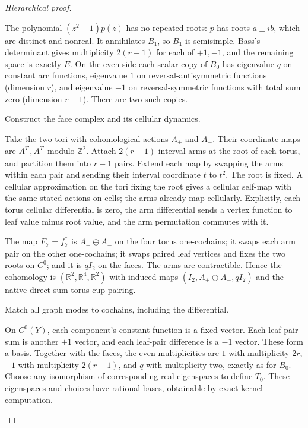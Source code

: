 \documentclass[11pt,a4paper]{article}
\theoremstyle{remark}\newtheorem{remark}[definition]{Remark}
\newcommand{\R}{\mathbb R}\newcommand{\C}{\mathbb C}\newcommand{\Z}{\mathbb Z}
\begin{document}
\begin{proof}[Hierarchical proof]
\begin{steps}
\begin{steps}
\item The polynomial $(z^2-1)p(z)$ has no repeated roots: $p$ has roots $a\pm ib$, which are distinct and nonreal. It annihilates $B_1$, so $B_1$ is semisimple. Bass's determinant gives multiplicity $2(r-1)$ for each of $+1,-1$, and the remaining space is exactly $E$. On the even side each scalar copy of $B_0$ has eigenvalue $q$ on constant arc functions, eigenvalue $1$ on reversal-antisymmetric functions (dimension $r$), and eigenvalue $-1$ on reversal-symmetric functions with total sum zero (dimension $r-1$). There are two such copies.
\end{steps}
\item Construct the face complex and its cellular dynamics.
\begin{steps}
\item Take the two tori with cohomological actions $A_+$ and $A_-$. Their coordinate maps are $A_+^T,A_-^T$ modulo $\Z^2$. Attach $2(r-1)$ interval arms at the root of each torus, and partition them into $r-1$ pairs. Extend each map by swapping the arms within each pair and sending their interval coordinate $t$ to $t^2$. The root is fixed. A cellular approximation on the tori fixing the root gives a cellular self-map with the same stated actions on cells; the arms already map cellularly. Explicitly, each torus cellular differential is zero, the arm differential sends a vertex function to leaf value minus root value, and the arm permutation commutes with it.
\item The map $F_Y=f_Y^*$ is $A_+\oplus A_-$ on the four torus one-cochains; it swaps each arm pair on the other one-cochains; it swaps paired leaf vertices and fixes the two roots on $C^0$; and it is $qI_2$ on the faces. The arms are contractible. Hence the cohomology is $(\R^2,\R^4,\R^2)$ with induced maps $(I_2,A_+\oplus A_-,qI_2)$ and the native direct-sum torus cup pairing.
\end{steps}
\item Match all graph modes to cochains, including the differential.
\begin{steps}
\item On $C^0(Y)$, each component's constant function is a fixed vector. Each leaf-pair sum is another $+1$ vector, and each leaf-pair difference is a $-1$ vector. These form a basis. Together with the faces, the even multiplicities are $1$ with multiplicity $2r$, $-1$ with multiplicity $2(r-1)$, and $q$ with multiplicity two, exactly as for $B_0$. Choose any isomorphism of corresponding real eigenspaces to define $T_0$. These eigenspaces and choices have rational bases, obtainable by exact kernel computation.

\end{steps}
\end{steps}
\end{proof}
\end{document}
